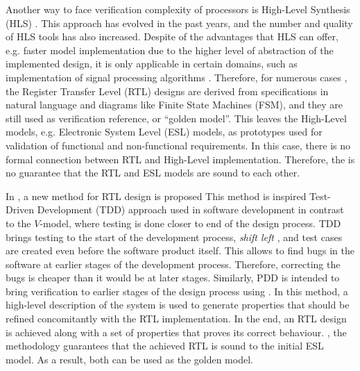 Another way to face verification complexity of processors is High-Level Synthesis (HLS) . This approach has evolved in the past years, and the number and quality of HLS tools has also increased. Despite of the advantages that HLS can offer, e.g. faster model implementation due to the higher level of abstraction of the implemented design, it is only applicable in certain domains, such as implementation of signal processing algorithms \cite{paper-pdd}. Therefore, for numerous cases , the Register Transfer Level (RTL) designs are derived from specifications in natural language and diagrams like Finite State Machines (FSM), and they are still used as verification reference, or “golden model”. This leaves the High-Level models, e.g. Electronic System Level (ESL) models, as prototypes used for validation of functional and non-functional requirements. In this case, there is no formal connection between RTL and High-Level implementation. Therefore, the is no guarantee that the RTL and ESL models are sound to each other. 

In \cite{paper-pdd}, a new method for RTL design is proposed   This method is inspired   Test-Driven Development (TDD)  approach used in software development in contrast to the $V$-model, where testing is done closer to end of the design process. TDD brings testing to the start of the development process, \textit{shift left} , and test cases are created even before the software product itself. This allows to find bugs in the software at earlier stages of the development process. Therefore, correcting the bugs is cheaper than it would be at later stages. Similarly, PDD is intended to bring verification to earlier stages of the design process using . In this method, a high-level description of the system is used to generate properties that should be refined concomitantly with the RTL implementation. In the end, an RTL design is achieved along with a set of properties that proves its correct behaviour. , the methodology guarantees that the achieved RTL is sound  to the initial ESL model. As a result, both can be used as the golden model.

